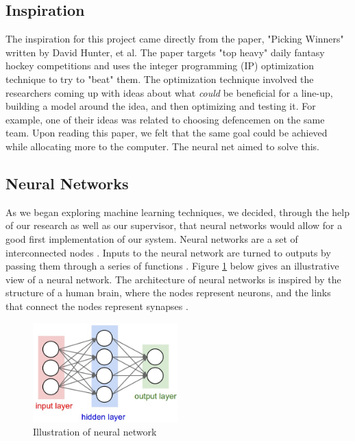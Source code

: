 \subsection{Inspiration}
The inspiration for this project came directly from the paper, "Picking Winners" written by David Hunter, et al. The paper targets "top heavy" daily fantasy hockey competitions and uses the integer programming (IP) optimization technique to try to "beat" them. The optimization technique involved the researchers coming up with ideas about what \textit{could} be beneficial for a line-up, building a model around the idea, and then optimizing and testing it. For example, one of their ideas was related to choosing defencemen on the same team. Upon reading this paper, we felt that the same goal could be achieved while allocating more to the computer. The neural net aimed to solve this. 

\subsection{Neural Networks}
As we began exploring machine learning techniques, we decided, through the help of our research as well as our supervisor, that neural networks would allow for a good first implementation of our system. Neural networks are a set of interconnected nodes \cite{neural_net}. Inputs to the neural network are turned to outputs by passing them through a series of functions \cite{neural_net}. Figure \ref{fig:neural_net} below gives an illustrative view of a neural network. The architecture of neural networks is inspired by the structure of a human brain, where the nodes represent neurons, and the links that connect the nodes represent synapses \cite{neural_net}.

\begin{figure}[ht]
    \centering
    \includegraphics[width=0.50\textwidth]{figures/neural_net}
    \caption{Illustration of neural network \cite{neural_net} }
    \label{fig:neural_net}
\end{figure}

